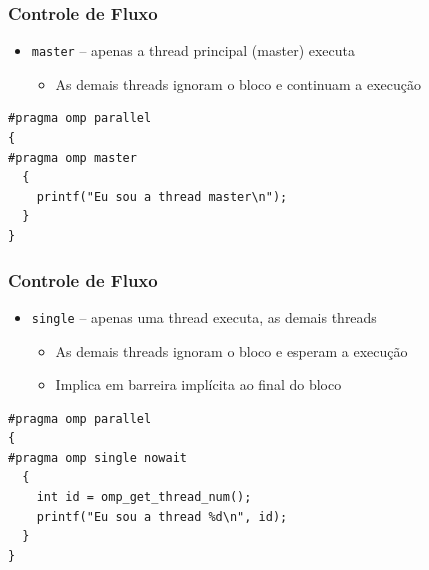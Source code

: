 \documentclass[xcolor={usenames,dvipsnames},12pt,presentation,aspectratio=169]{beamer}
\begin{document}
\begin{frame}[fragile]
  \frametitle{Controle de Fluxo}
  \begin{itemize}
  \item \texttt{master} -- apenas a thread principal (master) executa
    \begin{itemize}
    \item As demais threads ignoram o bloco e \alert{continuam} a execução
    \end{itemize}
  \end{itemize}
\begin{minipage}{0.95\textwidth}  
\begin{verbatim}  
#pragma omp parallel
{
#pragma omp master
  {
    printf("Eu sou a thread master\n"); 
  }
}
\end{verbatim}
\end{minipage}
\end{frame}
\begin{frame}[fragile]
  \frametitle{Controle de Fluxo}
  \begin{itemize}
  \item \texttt{single} -- apenas uma thread executa, as demais threads 
    \begin{itemize}
    \item As demais threads ignoram o bloco e \alert{esperam} a execução
    \item \alert{Implica em barreira implícita ao final do bloco}
    \end{itemize}
  \end{itemize}
\begin{minipage}{0.95\textwidth}  
\begin{verbatim}  
#pragma omp parallel
{
#pragma omp single nowait
  {
    int id = omp_get_thread_num();
    printf("Eu sou a thread %d\n", id);
  }
}
\end{verbatim}
\end{minipage}
\end{frame}
\end{document}
